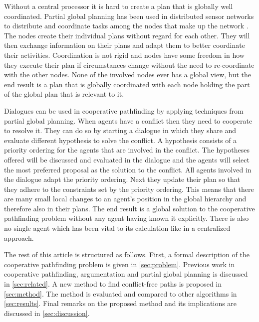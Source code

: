 Without a central processor it is hard to create a plan that is globally well
coordinated. Partial global planning has been used in distributed sensor 
networks to distribute and coordinate tasks among the nodes that make up the 
network \citep{durfee1991}. The nodes create their individual plans without 
regard for each other. They will then exchange information on their plans and 
adapt them to better coordinate their activities. Coordination is not rigid and 
nodes have some freedom in how they execute their plan if circumstances change 
without the need to re-coordinate with the other nodes. None of the involved 
nodes ever has a global view, but the end result is a plan that is globally 
coordinated with each node holding the part of the global plan that is relevant 
to it.

Dialogues can be used in cooperative pathfinding by applying techniques from
partial global planning. When agents have a conflict then they need to
cooperate to resolve it. They can do so by starting a dialogue in which
they share and evaluate different hypothesis to solve the conflict. A
hypothesis consists of a priority ordering for the agents that are involved in
the conflict. The hypotheses offered will be discussed and evaluated in the
dialogue and the agents will select the most preferred proposal as the solution 
to the conflict. All agents involved in the dialogue adapt the priority 
ordering. Next they update their plan so that they adhere to the constraints 
set by the priority ordering. This means that there are many small local 
changes to an agent's position in the global hierarchy and therefore also in 
their plans. The end result is a global solution to the cooperative pathfinding 
problem without any agent having known it explicitly. There is also no single 
agent which has been vital to its calculation like in a centralized approach.

The rest of this article is structured as follows. First, a formal description
of the cooperative pathfinding problem is given in \autoref{sec:problem}.
Previous work in cooperative pathfinding, argumentation and partial global
planning is discussed in \autoref{sec:related}. A new method to find
conflict-free paths is proposed in \autoref{sec:method}. The method is
evaluated and compared to other algorithms in \autoref{sec:results}. Final
remarks on the proposed method and its implications are discussed in
\autoref{sec:discussion}.
